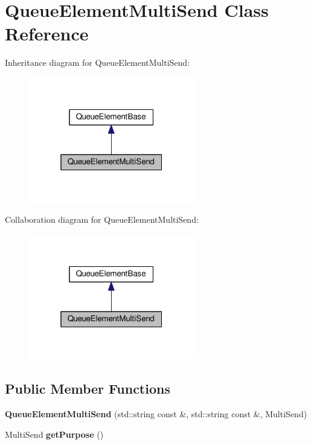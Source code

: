 \hypertarget{classQueueElementMultiSend}{}\section{Queue\+Element\+Multi\+Send Class Reference}
\label{classQueueElementMultiSend}


Inheritance diagram for Queue\+Element\+Multi\+Send\+:\nopagebreak
\begin{figure}[H]
\begin{center}
\leavevmode
\includegraphics[width=205pt]{classQueueElementMultiSend__inherit__graph}
\end{center}
\end{figure}


Collaboration diagram for Queue\+Element\+Multi\+Send\+:\nopagebreak
\begin{figure}[H]
\begin{center}
\leavevmode
\includegraphics[width=205pt]{classQueueElementMultiSend__coll__graph}
\end{center}
\end{figure}
\subsection*{Public Member Functions}
\begin{DoxyCompactItemize}
\item 
{\bfseries Queue\+Element\+Multi\+Send} (std\+::string const \&, std\+::string const \&, Multi\+Send)\hypertarget{classQueueElementMultiSend_a07b95e3ae8badfb17d67f8e0714c3667}{}\label{classQueueElementMultiSend_a07b95e3ae8badfb17d67f8e0714c3667}

\item 
Multi\+Send {\bfseries get\+Purpose} ()\hypertarget{classQueueElementMultiSend_a2318835ba88e5020022365640a50281b}{}\label{classQueueElementMultiSend_a2318835ba88e5020022365640a50281b}

\end{DoxyCompactItemize}
